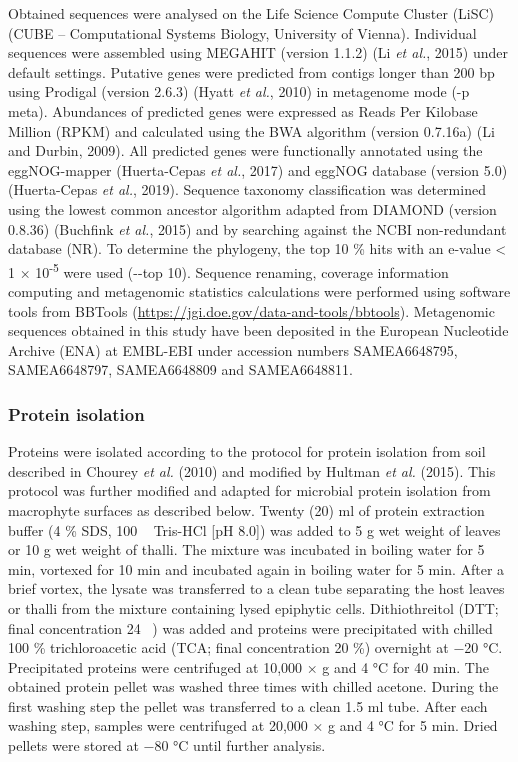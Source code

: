 \documentclass[12pt,]{article}
\begin{document}
Obtained sequences were analysed on the Life Science Compute Cluster
(LiSC) (CUBE -- Computational Systems Biology, University of Vienna).
Individual sequences were assembled using MEGAHIT (version 1.1.2) (Li
\emph{et al.}, 2015) under default settings. Putative genes were
predicted from contigs longer than 200 bp using Prodigal (version 2.6.3)
(Hyatt \emph{et al.}, 2010) in metagenome mode (-p meta). Abundances of
predicted genes were expressed as Reads Per Kilobase Million (RPKM) and
calculated using the BWA algorithm (version 0.7.16a) (Li and Durbin,
2009). All predicted genes were functionally annotated using the
eggNOG-mapper (Huerta-Cepas \emph{et al.}, 2017) and eggNOG database
(version 5.0) (Huerta-Cepas \emph{et al.}, 2019). Sequence taxonomy
classification was determined using the lowest common ancestor algorithm
adapted from DIAMOND (version 0.8.36) (Buchfink \emph{et al.}, 2015) and
by searching against the NCBI non-redundant database (NR). To determine
the phylogeny, the top 10 \si{\percent} hits with an e-value \textless{}
1 × 10\textsuperscript{-5} were used (-\/-top 10). Sequence renaming,
coverage information computing and metagenomic statistics calculations
were performed using software tools from BBTools
(\url{https://jgi.doe.gov/data-and-tools/bbtools}). Metagenomic
sequences obtained in this study have been deposited in the European
Nucleotide Archive (ENA) at EMBL-EBI under accession numbers
SAMEA6648795, SAMEA6648797, SAMEA6648809 and SAMEA6648811.

\hypertarget{protein-isolation}{%
\subsubsection{Protein isolation}\label{protein-isolation}}

Proteins were isolated according to the protocol for protein isolation
from soil described in Chourey \emph{et al.} (2010) and modified by
Hultman \emph{et al.} (2015). This protocol was further modified and
adapted for microbial protein isolation from macrophyte surfaces as
described below. Twenty (20) \si{\ml} of protein extraction buffer (4
\si{\percent} SDS, 100 \si{\milli\Molar} Tris-HCl {[}pH 8.0{]}) was
added to 5 \si{\g} wet weight of leaves or 10 \si{\g} wet weight of
thalli. The mixture was incubated in boiling water for 5 \si{\minute},
vortexed for 10 \si{\minute} and incubated again in boiling water for 5
\si{\minute}. After a brief vortex, the lysate was transferred to a
clean tube separating the host leaves or thalli from the mixture
containing lysed epiphytic cells. Dithiothreitol (DTT; final
concentration 24 \si{\milli\Molar}) was added and proteins were
precipitated with chilled 100 \si{\percent} trichloroacetic acid (TCA;
final concentration 20 \si{\percent}) overnight at \num{-20} °C.
Precipitated proteins were centrifuged at 10,000 × g and 4
\si{\degreeCelsius} for 40 \si{\minute}. The obtained protein pellet was
washed three times with chilled acetone. During the first washing step
the pellet was transferred to a clean 1.5 \si{\ml} tube. After each
washing step, samples were centrifuged at 20,000 × g and 4
\si{\degreeCelsius} for 5 \si{\minute}. Dried pellets were stored at
\num{-80} °C until further analysis.
\end{document}
